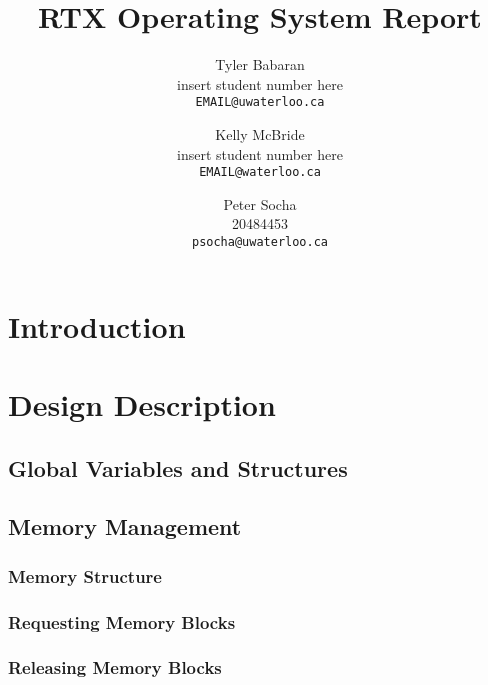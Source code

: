 \documentclass[12pt]{report}
\begin{document}
\title{RTX Operating System Report}

\author{
    Tyler Babaran\\
		insert student number here\\
    \texttt{EMAIL@uwaterloo.ca}
    \and
    Kelly McBride\\
		insert student number here\\
    \texttt{EMAIL@waterloo.ca}
    \and
    Peter Socha\\
		20484453\\
    \texttt{psocha@uwaterloo.ca}
}

\maketitle


\tableofcontents
\listofalgorithms
\listoffigures

\chapter{Introduction}

\chapter{Design Description}

\section{Global Variables and Structures}


\section{Memory Management}

\subsection{Memory Structure}

\subsection{Requesting Memory Blocks}

\subsection{Releasing Memory Blocks}



\end{document}
